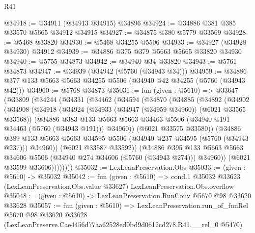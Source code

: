 \begin{lexlean}{R41}
\begin{coremodule}
@34918 := @34911 (@34913 @34915) @34896
@34924 := @34886 @381 @385 @33570 @5665 @34912 @34915
@34927 := @34875 @380 @5779 @33569
@34928 := @5468 @33820
@34930 := @5468 @34255 @5506
@34933 := @34927 (@34928 @34930) @34912
@34939 := @34886 @375 @379 @5663 @5665 @33820 @34930
@34940 := @5755 @34873
@34942 := @34940 @34 @33820
@34943 := @5761 @34873
@34947 := @34939 (@34942 (@5760 (@34943 @34)))
@34959 := @34886 @377 @133 @5663 @5663 @34255 @5506 (@34940 @42 @34255 (@5760 (@34943 @42)))
@34960 := @5768 @34873
@35031 := fun (given : @5610) =>
  @33647
    (@33809
      (@34244
        (@34331
          (@34462
            (@34594
              (@34870
                (@34885
                  (@34892
                    (@34902
                      (@34908
                        (@34918
                          (@34924
                            (@34933 (@34947 (@34959 @34960)) (@6021 @33565 @33568))
                            (@34886
                              @383
                              @133
                              @5663
                              @5663
                              @34463
                              @5506
                              (@34940 @191 @34463 (@5760 (@34943 @191)))
                              @34960))
                          (@6021 @33575 @33580))
                        (@34886
                          @389
                          @133
                          @5663
                          @5663
                          @34595
                          @5506
                          (@34940 @237 @34595 (@5760 (@34943 @237)))
                          @34960))
                      (@6021 @33587 @33592))
                    (@34886
                      @395
                      @133
                      @5663
                      @5663
                      @34606
                      @5506
                      (@34940 @274 @34606 (@5760 (@34943 @274)))
                      @34960))
                  (@6021 @33599 @33606))))))))
@35032 := LexLeanPreservation.Obs
@35033 := (given : @5610) -> @35032
@35042 := fun (given : @5610) =>
  cond.{1} @35032 @33623 (LexLeanPreservation.Obs.value @33627) LexLeanPreservation.Obs.overflow
@35048 := (given : @5610) -> LexLeanPreservation.RunConv @5670 @98 @33620 @33628
@35057 := fun (given : @5610) =>
  LexLeanPreservation.run_of_funRel
    @5670
    @98
    @33620
    @33628
    (LexLeanPreserve.Cae4456d77aa62528ed0bd9d0612cd278.R41.__rel_0 @5470)
\end{coremodule}
\end{lexlean}
